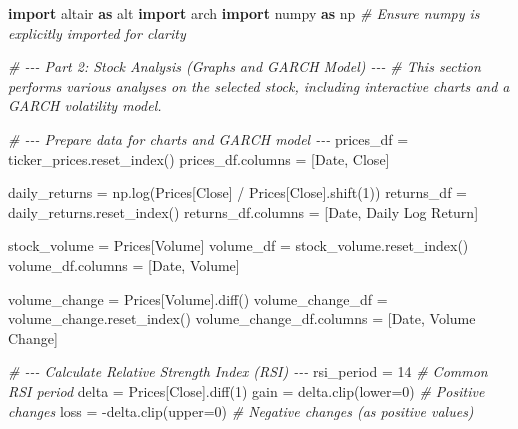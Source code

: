 \documentclass[
  11pt,
]{article}
\newenvironment{Shaded}{}{}
\newcommand{\CommentTok}[1]{\textcolor[rgb]{0.38,0.63,0.69}{\textit{#1}}}
\newcommand{\DecValTok}[1]{\textcolor[rgb]{0.25,0.63,0.44}{#1}}
\newcommand{\ImportTok}[1]{\textcolor[rgb]{0.00,0.50,0.00}{\textbf{#1}}}
\newcommand{\NormalTok}[1]{#1}
\newcommand{\OperatorTok}[1]{\textcolor[rgb]{0.40,0.40,0.40}{#1}}
\newcommand{\StringTok}[1]{\textcolor[rgb]{0.25,0.44,0.63}{#1}}
\begin{document}
\begin{Shaded}
\begin{Highlighting}[]
\ImportTok{import}\NormalTok{ altair }\ImportTok{as}\NormalTok{ alt}
\ImportTok{import}\NormalTok{ arch}
\ImportTok{import}\NormalTok{ numpy }\ImportTok{as}\NormalTok{ np }\CommentTok{\# Ensure numpy is explicitly imported for clarity}

\CommentTok{\# {-}{-}{-} Part 2: Stock Analysis (Graphs and GARCH Model) {-}{-}{-}}
\CommentTok{\# This section performs various analyses on the selected stock, including interactive charts and a GARCH volatility model.}

\CommentTok{\# {-}{-}{-} Prepare data for charts and GARCH model {-}{-}{-}}
\NormalTok{prices\_df }\OperatorTok{=}\NormalTok{ ticker\_prices.reset\_index()}
\NormalTok{prices\_df.columns }\OperatorTok{=}\NormalTok{ [}\StringTok{\textquotesingle{}Date\textquotesingle{}}\NormalTok{, }\StringTok{\textquotesingle{}Close\textquotesingle{}}\NormalTok{]}

\NormalTok{daily\_returns }\OperatorTok{=}\NormalTok{ np.log(Prices[}\StringTok{\textquotesingle{}Close\textquotesingle{}}\NormalTok{] }\OperatorTok{/}\NormalTok{ Prices[}\StringTok{\textquotesingle{}Close\textquotesingle{}}\NormalTok{].shift(}\DecValTok{1}\NormalTok{))}
\NormalTok{returns\_df }\OperatorTok{=}\NormalTok{ daily\_returns.reset\_index()}
\NormalTok{returns\_df.columns }\OperatorTok{=}\NormalTok{ [}\StringTok{\textquotesingle{}Date\textquotesingle{}}\NormalTok{, }\StringTok{\textquotesingle{}Daily Log Return\textquotesingle{}}\NormalTok{]}

\NormalTok{stock\_volume }\OperatorTok{=}\NormalTok{ Prices[}\StringTok{\textquotesingle{}Volume\textquotesingle{}}\NormalTok{]}
\NormalTok{volume\_df }\OperatorTok{=}\NormalTok{ stock\_volume.reset\_index()}
\NormalTok{volume\_df.columns }\OperatorTok{=}\NormalTok{ [}\StringTok{\textquotesingle{}Date\textquotesingle{}}\NormalTok{, }\StringTok{\textquotesingle{}Volume\textquotesingle{}}\NormalTok{]}

\NormalTok{volume\_change }\OperatorTok{=}\NormalTok{ Prices[}\StringTok{\textquotesingle{}Volume\textquotesingle{}}\NormalTok{].diff()}
\NormalTok{volume\_change\_df }\OperatorTok{=}\NormalTok{ volume\_change.reset\_index()}
\NormalTok{volume\_change\_df.columns }\OperatorTok{=}\NormalTok{ [}\StringTok{\textquotesingle{}Date\textquotesingle{}}\NormalTok{, }\StringTok{\textquotesingle{}Volume Change\textquotesingle{}}\NormalTok{]}


\CommentTok{\# {-}{-}{-} Calculate Relative Strength Index (RSI) {-}{-}{-}}
\NormalTok{rsi\_period }\OperatorTok{=} \DecValTok{14} \CommentTok{\# Common RSI period}
\NormalTok{delta }\OperatorTok{=}\NormalTok{ Prices[}\StringTok{\textquotesingle{}Close\textquotesingle{}}\NormalTok{].diff(}\DecValTok{1}\NormalTok{)}
\NormalTok{gain }\OperatorTok{=}\NormalTok{ delta.clip(lower}\OperatorTok{=}\DecValTok{0}\NormalTok{) }\CommentTok{\# Positive changes}
\NormalTok{loss }\OperatorTok{=} \OperatorTok{{-}}\NormalTok{delta.clip(upper}\OperatorTok{=}\DecValTok{0}\NormalTok{) }\CommentTok{\# Negative changes (as positive values)}


\end{Highlighting}
\end{Shaded}
\end{document}
